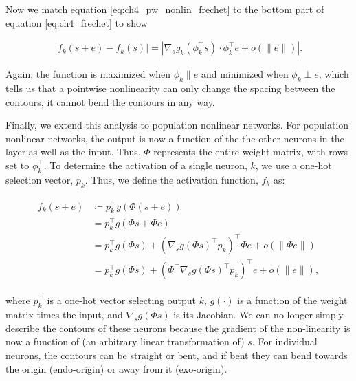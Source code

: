 Now we match equation \eqref{eq:ch4_pw_nonlin_frechet} to the bottom part of equation \eqref{eq:ch4_frechet} to show 

\begin{equation}
\begin{split}
    |f_{k}(s+e) - f_{k}(s)| = |\nabla_{s}g_{k}(\phi_{k}^\top s) \cdot \phi_{k}^\top e + o(\|e\|)|.
\end{split}
\end{equation}

Again, the function is maximized when $\phi_{k} \parallel e$ and minimized when $\phi_{k} \perp e$, which tells us that a pointwise nonlinearity can only change the spacing between the contours, it cannot bend the contours in any way.

Finally, we extend this analysis to population nonlinear networks. For population nonlinear networks, the output is now a function of the the other neurons in the layer as well as the input. Thus, $\Phi$ represents the entire weight matrix, with rows set to $\phi_{k}^\top$. To determine the activation of a single neuron, $k$, we use a one-hot selection vector, $p_{k}$. Thus, we define the activation function, $f_{k}$ as:

\begin{align}\label{eq:pop_nonlinear}
\begin{split}
   f_{k}(s+e) &\coloneqq p_{k}^\top g(\Phi(s+e)) \\
   &= p_{k}^\top g(\Phi s + \Phi e) \\
   &= p_{k}^\top g(\Phi s) + (\nabla_{s}g(\Phi s)^\top p_{k})^\top \Phi e + o(\|\Phi e\|) \\
   &= p_{k}^\top g(\Phi s) + (\Phi^\top \nabla_{s}g(\Phi s)^\top p_{k})^\top e + o(\|e\|),
\end{split}
\end{align}

where $p_{k}^\top$ is a one-hot vector selecting output $k$, $g(\cdot)$ is a function of the weight matrix times the input, and $\nabla_{s}g(\Phi s)$ is its Jacobian. We can no longer simply describe the contours of these neurons because the gradient of the non-linearity is now a function of (an arbitrary linear transformation of) $s$. For individual neurons, the contours can be straight or bent, and if bent they can bend towards the origin (endo-origin) or away from it (exo-origin).


